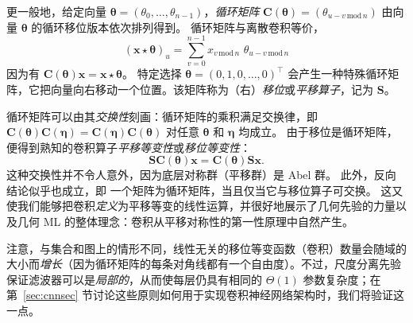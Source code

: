 
更一般地，给定向量 $\boldsymbol{\theta} = (\theta_0, \hdots, \theta_{n-1})$，{\em 循环矩阵}
$\mathbf{C}(\boldsymbol{\theta}) = (\theta_{u-v \, \mathrm{mod} \, n})$ 由向量 $\boldsymbol{\theta}$ 的循环移位版本依次排列得到。
%
循环矩阵与离散卷积等价，
$$
(\mathbf{x} \star \boldsymbol{\theta})_u = \sum_{v=0}^{n-1}  x_{v \, \mathrm{mod}\, n} \,\, \theta_{u-v \, \mathrm{mod}\, n}
$$
%
因为有 $\mathbf{C}(\boldsymbol{\theta})\mathbf{x} = \mathbf{x} \star \boldsymbol{\theta}$。
%
特定选择 $\boldsymbol{\theta}=(0,1,0,\hdots, 0)^\top$ 会产生一种特殊循环矩阵，它把向量向右移动一个位置。该矩阵称为（右）{\em 移位}或{\em 平移算子}，记为 $\mathbf{S}$。






循环矩阵可以由其{\em 交换性}刻画：循环矩阵的乘积满足交换律，即
$\mathbf{C}(\boldsymbol{\theta}) \mathbf{C}(\boldsymbol{\eta}) = \mathbf{C}(\boldsymbol{\eta}) \mathbf{C}(\boldsymbol{\theta})$ 对任意 $\boldsymbol{\theta}$ 和 $\boldsymbol{\eta}$ 均成立。
%
由于移位是循环矩阵，便得到熟知的卷积算子{\em 平移等变性}或{\em 移位等变性}：
$$
\mathbf{S} \mathbf{C}(\boldsymbol{\theta}) \mathbf{x} = 
\mathbf{C}(\boldsymbol{\theta}) \mathbf{S} \mathbf{x}.
$$
%
这种交换性并不令人意外，因为底层对称群（平移群）是 Abel 群。
此外，反向结论似乎也成立，即
一个矩阵为循环矩阵，当且仅当它与移位算子可交换。
%
这又使我们能够把卷积{\em 定义}为平移等变的线性运算，并很好地展示了几何先验的力量以及几何 ML 的整体理念：卷积从平移对称性的第一性原理中自然产生。


注意，与集合和图上的情形不同，线性无关的移位等变函数（卷积）数量会随域的大小而\emph{增长}（因为循环矩阵的每条对角线都有一个自由度）。不过，尺度分离先验保证滤波器可以是{\em 局部的}，从而使每层仍具有相同的 $\Theta(1)$ 参数复杂度；在第~\ref{sec:cnnsec} 节讨论这些原则如何用于实现卷积神经网络架构时，我们将验证这一点。

